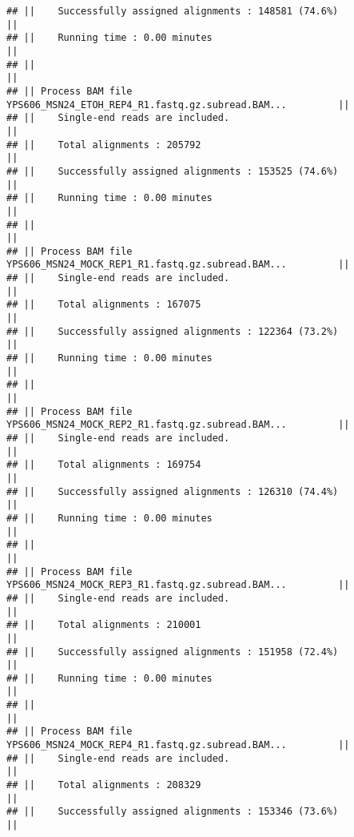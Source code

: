 \documentclass[
]{book}
\begin{document}
\begin{verbatim}
## ||    Successfully assigned alignments : 148581 (74.6%)                       ||
## ||    Running time : 0.00 minutes                                             ||
## ||                                                                            ||
## || Process BAM file YPS606_MSN24_ETOH_REP4_R1.fastq.gz.subread.BAM...         ||
## ||    Single-end reads are included.                                          ||
## ||    Total alignments : 205792                                               ||
## ||    Successfully assigned alignments : 153525 (74.6%)                       ||
## ||    Running time : 0.00 minutes                                             ||
## ||                                                                            ||
## || Process BAM file YPS606_MSN24_MOCK_REP1_R1.fastq.gz.subread.BAM...         ||
## ||    Single-end reads are included.                                          ||
## ||    Total alignments : 167075                                               ||
## ||    Successfully assigned alignments : 122364 (73.2%)                       ||
## ||    Running time : 0.00 minutes                                             ||
## ||                                                                            ||
## || Process BAM file YPS606_MSN24_MOCK_REP2_R1.fastq.gz.subread.BAM...         ||
## ||    Single-end reads are included.                                          ||
## ||    Total alignments : 169754                                               ||
## ||    Successfully assigned alignments : 126310 (74.4%)                       ||
## ||    Running time : 0.00 minutes                                             ||
## ||                                                                            ||
## || Process BAM file YPS606_MSN24_MOCK_REP3_R1.fastq.gz.subread.BAM...         ||
## ||    Single-end reads are included.                                          ||
## ||    Total alignments : 210001                                               ||
## ||    Successfully assigned alignments : 151958 (72.4%)                       ||
## ||    Running time : 0.00 minutes                                             ||
## ||                                                                            ||
## || Process BAM file YPS606_MSN24_MOCK_REP4_R1.fastq.gz.subread.BAM...         ||
## ||    Single-end reads are included.                                          ||
## ||    Total alignments : 208329                                               ||
## ||    Successfully assigned alignments : 153346 (73.6%)                       ||

\end{verbatim}
\end{document}
